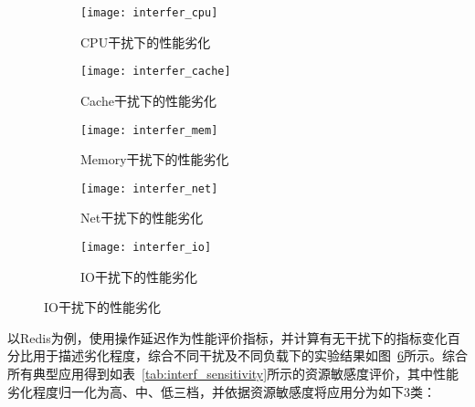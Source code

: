 \begin{figure}[H]
    \centering
    \begin{subfigure}[b]{0.32\textwidth}
        \texttt{[image: interfer\_cpu]}
        \caption{CPU干扰下的性能劣化}
        \label{fig:interfer_cpu}
    \end{subfigure}
    \begin{subfigure}[b]{0.32\textwidth}
      \texttt{[image: interfer\_cache]}
      \caption{Cache干扰下的性能劣化}
      \label{fig:interfer_cache}
    \end{subfigure}
    \begin{subfigure}[b]{0.32\textwidth}
        \texttt{[image: interfer\_mem]}
        \caption{Memory干扰下的性能劣化}
        \label{fig:interfer_mem}
    \end{subfigure}
    \begin{subfigure}[b]{0.32\textwidth}
        \texttt{[image: interfer\_net]}
        \caption{Net干扰下的性能劣化}
        \label{fig:interfer_net}
    \end{subfigure}
    \begin{subfigure}[b]{0.32\textwidth}
        \texttt{[image: interfer\_io]}
        \caption{IO干扰下的性能劣化}
        \label{fig:interfer_io}
    \end{subfigure}

\label{fig:redis_interf_sensitivity}
\end{figure}

以Redis为例，使用操作延迟作为性能评价指标，并计算有无干扰下的指标变化百分比用于描述劣化程度，综合不同干扰及不同负载下的实验结果如图~\ref{fig:redis_interf_sensitivity}所示。综合所有典型应用得到如表~\ref{tab:interf_sensitivity}所示的资源敏感度评价，其中性能劣化程度归一化为高、中、低三档，并依据资源敏感度将应用分为如下3类：

